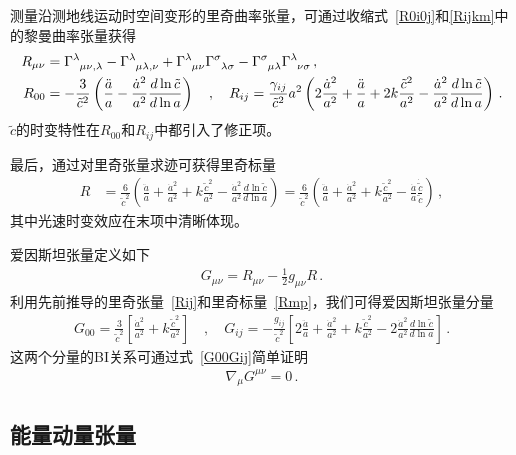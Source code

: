 \documentclass[jkps,preprint,fleqn]{revtex4}
\newcommand{\tc}{\tilde{c}}
\begin{document}
测量沿测地线运动时空间变形的里奇曲率张量，可通过收缩式~\eqref{R0i0j}和\eqref{Rijkm}中的黎曼曲率张量获得
\begin{align}
R_{\mu\nu} &= \tensor{\Gamma}{^\lambda_\mu_\nu_,_\lambda} - \tensor{\Gamma}{^\lambda_\mu_\lambda_,_\nu} + \tensor{\Gamma}{^\lambda_\mu_\nu} \tensor{\Gamma}{^\sigma_\lambda_\sigma} - \tensor{\Gamma}{^\sigma_\mu_\lambda} \tensor{\Gamma}{^\lambda_\nu_\sigma} \label{Rmn} \,, \\ R_{00} &= -\frac{3}{\tc^2} \left( \frac{\ddot{a}}{a} - \frac{\dot{a}^2}{a^2} \frac{d \ln \tc}{ d \ln a}  \right) \quad , \quad R_{ij} = \frac{\gamma_{ij}}{\tc^2} a^2 \left( 2 \frac{\dot{a}^2}{a^2} + \frac{\ddot{a}}{a} + 2 k \frac{\tc^2}{a^2} - \frac{\dot{a}^2}{a^2} \frac{d \ln \tc}{ d \ln a}  \right) \label{Rij} \,. \end{align}
$\tc$的时变特性在$R_{00}$和$R_{ij}$中都引入了修正项。

最后，通过对里奇张量求迹可获得里奇标量
\begin{align} R &= \frac{6}{\tc^2} \left( \frac{\ddot{a}}{a} + \frac{\dot{a}^2}{a^2} + k \frac{\tc^2}{a^2} - \frac{\dot{a}^2}{a^2} \frac{d \ln \tc}{ d \ln a}  \right) =  \frac{6}{\tc^2} \left( \frac{\ddot{a}}{a} + \frac{\dot{a}^2}{a^2} + k \frac{\tc^2}{a^2} - \frac{\dot{a}}{a} \frac{\dot{\tc}}{\tc}  \right)  \label{Rmp} \,, \end{align}
其中光速时变效应在末项中清晰体现。

爱因斯坦张量定义如下
\begin{align}
G_{\mu\nu} = R_{\mu\nu} - \frac{1}{2} g_{\mu\nu} R \label{Gmunu} \,.
\end{align}
利用先前推导的里奇张量~\eqref{Rij}和里奇标量~\eqref{Rmp}，我们可得爱因斯坦张量分量
\begin{align}
G_{00} = \frac{3}{\tc^2} \left[ \frac{\dot{a}^2}{a^2} + k \frac{\tc^2}{a^2} \right] \quad , \quad G_{ij} = -\frac{g_{ij}}{\tc^2} \left[ 2 \frac{\ddot{a}}{a} + \frac{\dot{a}^2}{a^2} + k \frac{\tc^2}{a^2} - 2 \frac{\dot{a}^2}{a^2} \frac{d \ln \tc}{d \ln a} \right] \,. \label{G00Gij}
\end{align}
这两个分量的BI关系可通过式~\eqref{G00Gij}简单证明
\begin{align}
\nabla_{\mu} G^{\mu \nu} = 0 \label{nablaGmunu} \,.
\end{align}
\subsection{能量动量张量}\label{subsec:Tmunu}
\end{document}

